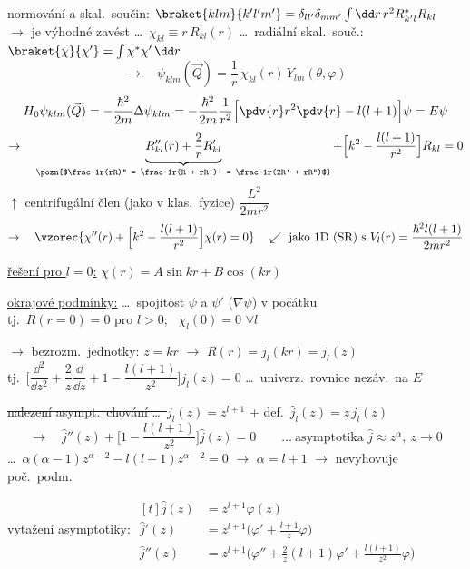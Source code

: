 normování a skal.\ součin: \quad $\braket{klm}{k'l'm'} = \delta_{ll'}\delta_{mm'}\int\dd r\,r^2R_{k'l}^*R_{kl}$ \\
$\to$ je výhodné zavést \dots\ $\chi_{kl} \equiv r\,R_{kl}(r)$ \dots\ radiální skal.\ souč.: $\braket{\chi}{\chi'} = \int\chi^*\chi'\,\dd r$
\[
  \to\quad \psi_{klm}(\vec Q) = \frac{1}{r}\,\chi_{kl}(r)\,Y_{lm}(\theta,\varphi)
\]
\[
  H_0\psi_{klm}(\vec Q) = -\frac{\hbar^2}{2m}\Delta\psi_{klm} = -\frac{\hbar^2}{2m}\frac{1}{r^2}\Big[\pdv{r}r^2\pdv{r} - l(l+1)\Big]\psi = E\psi
\]
\[
  \to\quad \underbrace{R_{kl}''(r) + \frac2r R_{kl}'}_{\pozn{$\frac1r(rR)'' = \frac1r(R + rR')' = \frac1r(2R' + rR'')$}}
  + \Big[k^2 - \frac{l(l+1)}{r^2}\Big]R_{kl} = 0
\]
\hspace*{7cm} $\uparrow$ centrifugální člen (jako v klas.\ fyzice) \quad $\dfrac{L^2}{2mr^2}$
\[
  \to\quad \vzorec{\chi''(r) + \Big[k^2 - \frac{l(l+1)}{r^2}\Big]\chi(r) = 0}
  \quad\swarrow\ \text{jako 1D (SR) s } V_l(r) = \frac{\hbar^2 l(l+1)}{2mr^2}
\]

\underline{řešení pro $l = 0$:} \quad $\chi(r) = A\sin kr + B\cos(kr)$

\underline{okrajové podmínky:} \dots\ spojitost $\psi$ a $\psi'$ ($\nabla\psi$) v počátku \\
\hspace*{3.5cm} tj.\ $R(r = 0) = 0$ pro $l > 0$; \ $\chi_l(0) = 0$ $\forall l$

$\to$ bezrozm.\ jednotky: \quad $z = kr$ \quad $\to$ \quad $R(r) = j_l(kr) = j_l(z)$ \\
tj.\ \quad $\Big[\dfrac{\dd^2}{\dd z^2} + \dfrac2z\dfrac{\dd}{\dd z} + 1 - \dfrac{l(l+1)}{z^2}\Big]j_l(z) = 0$ \quad \dots\ univerz.\ rovnice nezáv.\ na $E$

\sout{nalezení asympt.\ chování \dots\ $j_l(z) = z^{l+1}$} \quad + def.\ $\hat j_l(z) = z\,j_l(z)$
\[
  \to\quad \hat j''(z) + \Big[1 - \frac{l(l+1)}{z^2}\Big]\hat j(z) = 0 \qquad\dots\ \text{asymptotika } \hat j \approx z^\alpha,\ z\to 0
\]
\quad \dots\ $\alpha(\alpha-1)z^{\alpha-2} - l(l+1)z^{\alpha-2} = 0$ \quad $\to$ \quad $\alpha = l+1$ \quad
{\color{gray} $\to$ nevyhovuje poč.\ podm.}

vytažení asymptotiky: \quad
$\begin{aligned}[t]
  \hat j(z) &= z^{l+1}\varphi(z) \\
  \hat j'(z) &= z^{l+1}\Big(\varphi' + \frac{l+1}{z}\varphi\Big) \\
  \hat j''(z) &= z^{l+1}\Big(\varphi'' + \frac2z(l+1)\varphi' + \frac{l(l+1)}{z^2}\varphi\Big)
\end{aligned}$

